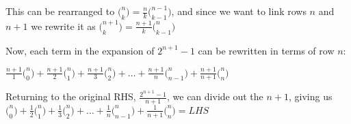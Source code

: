 \documentclass[../main.tex]{subfiles}
\begin{document}
\begin{enumerate}
    This can be rearranged to \(\bigl(^n_k\bigr)=\frac{n}{k}\bigl(^{n-1}_{k-1}\bigr) \), and since we want to link rows $n$ and $n+1$ we rewrite it as \(\bigl(^{n+1}_{k}\bigr)=\frac{n+1}{k}\bigl(^{n}_{k-1}\bigr) \)

    Now, each term in the expansion of $2^{n+1}-1$ can be rewritten in terms of row $n$:

    \(\frac{n+1}{1}\bigl(^n_0\bigr)+\frac{n+1}{2}\bigl(^n_1\bigr)+\frac{n+1}{3}\bigl(^n_2\bigr)+\dots+\frac{n+1}{n}\bigl(^n_{n-1}\bigr)+\frac{n+1}{n+1}\bigl(^n_n\bigr)\)

    Returning to the original RHS, \(\frac{2^{n+1}-1}{n+1}\), we can divide out the $n+1$, giving us \(\bigl(^n_0\bigr)+\frac{1}{2}\bigl(^n_1\bigr)+\frac{1}{3}\bigl(^n_2\bigr)+\dots+\frac{1}{n}\bigl(^n_{n-1}\bigr)+\frac{1}{n+1}\bigl(^n_n\bigr)=LHS\)
\end{enumerate}
\end{document}
